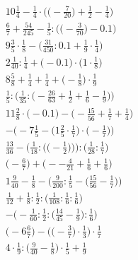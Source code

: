 \documentclass[8pt]{article}
\begin{document}
\begin{align}
10\frac{1}{4} - \frac{1}{4} \cdot \Big(\big(-\frac{7}{20}\big) + \frac{1}{2} - \frac{1}{4}\Big) \\
\frac{6}{7} + \frac{54}{245} - \frac{1}{5} : \Big(\big(-\frac{3}{70}\big) - 0.1\Big) \\
9\frac{3}{5} \cdot \frac{1}{8} - \big(\frac{31}{450} : 0.1 + \frac{1}{9} \cdot \frac{1}{4}\big) \\
2\frac{1}{40} : \frac{1}{4} + \big(-0.1\big) \cdot \big(1 \cdot \frac{1}{8}\big) \\
8\frac{5}{8} + \frac{1}{4} + \frac{1}{4} + \big(-\frac{1}{8}\big) \cdot \frac{1}{9} \\
\frac{1}{5} : \Big(\frac{1}{35} : \big(-\frac{26}{63} + \frac{1}{2} + \frac{1}{6} - \frac{1}{9}\big)\Big) \\
11\frac{2}{8} \cdot \big(-0.1\big) - \big(-\frac{15}{56} + \frac{1}{7} + \frac{1}{4}\big) \\
-\Big(-7\frac{1}{5} - \big(1\frac{2}{5} \cdot \frac{1}{7}\big) \cdot \big(-\frac{1}{7}\big)\Big) \\
\frac{13}{36} - \bigg(\frac{1}{18} : \Big(\big(-\frac{1}{2}\big)\Big)\bigg) : \bigg(\frac{1}{28} : \frac{1}{7}\bigg) \\
\big(-\frac{6}{7}\big) + \big(--\frac{4}{21} + \frac{1}{6} + \frac{1}{6}\big) \\
1\frac{9}{40} - \frac{1}{8} - \Big(\frac{9}{200} : \frac{1}{5} - \big(\frac{15}{56} - \frac{1}{7}\big)\Big) \\
\frac{1}{12} + \frac{1}{8} : \frac{1}{2} : \big(\frac{1}{108} : \frac{1}{6} : \frac{1}{6}\big) \\
-\Big(-\frac{1}{60} : \frac{1}{2} : \big(\frac{14}{45} - \frac{1}{9}\big) : \frac{1}{6}\Big) \\
\Big(-6\frac{6}{7}\Big) - \Big(\big(-\frac{3}{7}\big) \cdot \frac{1}{3}\Big) \cdot \frac{1}{7} \\
4 \cdot \frac{1}{9} : \big(\frac{9}{40} - \frac{1}{8}\big) \cdot \frac{1}{5} + \frac{1}{9}
\end{align}
\end{document}
